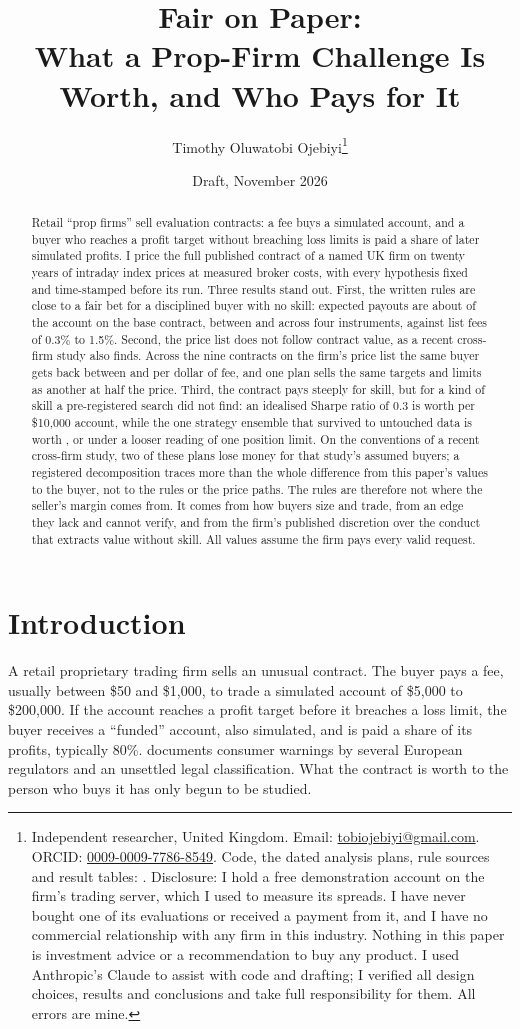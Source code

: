 \documentclass[11pt]{article}
\title{Fair on Paper:\\ What a Prop-Firm Challenge Is Worth, and Who Pays for It}
\author{Timothy Oluwatobi Ojebiyi\thanks{Independent researcher, United Kingdom. Email:
\href{mailto:tobiojebiyi@gmail.com}{tobiojebiyi@gmail.com}. ORCID:
\href{https://orcid.org/0009-0009-7786-8549}{0009-0009-7786-8549}. Code, the dated analysis plans, rule sources and result
tables: \RepoNote. Disclosure: I hold a free demonstration account on the firm's trading server, which I used to
measure its spreads. I have never bought one of its evaluations or received a payment from it, and I have no
commercial relationship with any firm in this industry. Nothing in this paper is investment advice or a
recommendation to buy any product. I used Anthropic's Claude to assist with code and drafting; I verified all design
choices, results and conclusions and take full responsibility for them. All errors are mine.}}
\date{Draft, November 2026}
\begin{document}
\maketitle

\begin{abstract}
\noindent
Retail ``prop firms'' sell evaluation contracts: a fee buys a simulated account, and a buyer who reaches a profit
target without breaching loss limits is paid a share of later simulated profits. I price the full published
contract of a named UK firm on twenty years of intraday index prices at measured broker costs, with every
hypothesis fixed and time-stamped before its run. Three results stand out. First, the written rules are close to a
fair bet for a disciplined buyer with no skill: expected payouts are about \VcoinPct{} of the account on the base
contract, between \BookLo{} and \BookHi{} across four instruments, against list fees of 0.3\% to 1.5\%. Second, the
price list does not follow contract value, as a recent cross-firm study also finds. Across the nine contracts on the firm's price list the same buyer gets back between
\PerFeeMin{} and \PerFeeMax{} per dollar of fee, and one plan sells the same targets and limits as another at half
the price. Third, the contract pays steeply for skill, but for a kind of skill a pre-registered search did not
find: an idealised Sharpe ratio of 0.3 is worth \Vskill{} per \$10,000 account, while the one strategy ensemble
that survived to untouched data is worth \VRthreeLate{}, or \VRthreeLatePos{} under a looser reading of one position
limit. On the conventions of a recent cross-firm study, two of these plans lose money for that study's assumed
buyers; a registered decomposition traces more than the whole difference from this paper's values to the buyer,
not to the rules or the price paths. The rules are therefore not where the seller's margin comes from. It comes from how buyers size and trade, from an edge they lack and cannot verify, and from the firm's
published discretion over the conduct that extracts value without skill. All values assume the firm pays every
valid request.
\end{abstract}

\section{Introduction}
A retail proprietary trading firm sells an unusual contract. The buyer pays a fee,
usually between \$50 and \$1,000, to trade a simulated account of \$5,000 to \$200,000. If the account reaches a
profit target before it breaches a loss limit, the buyer receives a ``funded'' account, also simulated, and is paid
a share of its profits, typically 80\%. \citet{lim2026} documents consumer warnings by several European regulators
and an unsettled legal classification. What the contract is worth to the person who buys it has only begun to be
studied.
\end{document}
